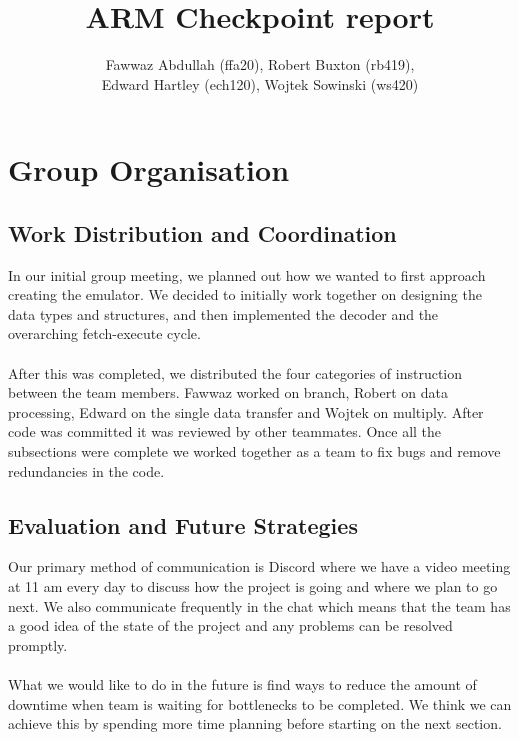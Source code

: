 \documentclass[8pt]{article}
\begin{document}
\title{ARM Checkpoint report}
\author{Fawwaz Abdullah (ffa20), Robert Buxton (rb419), \\Edward Hartley (ech120), Wojtek Sowinski (ws420) }

\maketitle

\section{Group Organisation}

\subsection{Work Distribution and Coordination}

In our initial group meeting, we planned out how we wanted to first approach
creating the emulator. We decided to initially work together on designing the
data types and structures, and then implemented the decoder and the overarching
fetch-execute cycle. \\ \\
After this was completed, we distributed the four categories
of instruction between the team members. Fawwaz worked on branch, Robert on data
processing, Edward on the single data transfer and Wojtek on multiply. After
code was committed it was reviewed by other teammates. Once all the subsections were complete we worked together as a team to fix bugs
and remove redundancies in the code.

\subsection{Evaluation and Future Strategies}

Our primary method of communication is Discord where we have a video meeting at
11 am every day to discuss how the project is going and where we plan to go next.
We also communicate frequently in the chat which means that the team has a good
idea of the state of the project and any problems can be resolved promptly. \\ \\
What we would like to do in the future is find ways to reduce the amount of
downtime when team is waiting for bottlenecks to be completed. We think we can
achieve this by spending more time planning before starting on the next section.
\end{document}

